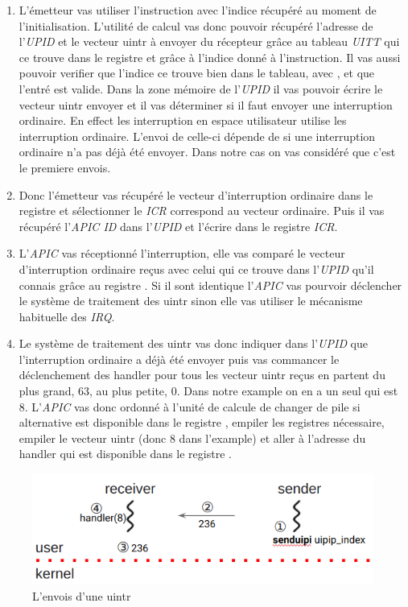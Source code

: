 \begin{enumerate}[label=\protect\circled{\arabic*}]
  \item L'émetteur vas utiliser l'instruction  avec l'indice récupéré au moment de l'initialisation.
  L'utilité de calcul vas donc pouvoir récupéré l'adresse de l'\emph{UPID} et le vecteur uintr à envoyer du récepteur grâce au tableau \emph{UITT} qui ce trouve dans le registre  et grâce à l'indice donné à l'instruction.
  Il vas aussi pouvoir verifier que l'indice ce trouve bien dans le tableau, avec , et que l'entré est valide.
  Dans la zone mémoire de l'\emph{UPID} il vas pouvoir écrire le vecteur uintr envoyer et il vas déterminer si il faut envoyer une interruption ordinaire.
  En effect les interruption en espace utilisateur utilise les interruption ordinaire.
  L'envoi de celle-ci dépende de si une interruption ordinaire n'a pas déjà été envoyer.
  Dans notre cas on vas considéré que c'est le premiere envois.
  \item Donc l'émetteur vas récupéré le vecteur d'interruption ordinaire dans le registre  et sélectionner le \emph{ICR} correspond au vecteur ordinaire.
  Puis il vas récupéré l'\emph{APIC ID} dans l'\emph{UPID} et l'écrire dans le registre \emph{ICR}.
  \item L'\emph{APIC} vas réceptionné l'interruption, elle vas comparé le vecteur d'interruption ordinaire reçus avec celui qui ce trouve dans l'\emph{UPID} qu'il connais grâce au registre .
  Si il sont identique l'\emph{APIC} vas pourvoir déclencher le système de traitement des uintr sinon elle vas utiliser le mécanisme habituelle des \emph{IRQ}.
  \item Le système de traitement des uintr vas donc indiquer dans l'\emph{UPID} que l'interruption ordinaire a déjà été envoyer puis vas commancer le déclenchement des handler pour tous les vecteur uintr reçus en partent du plus grand, 63, au plus petite, 0. %
  Dans notre example on en a un seul qui est 8.
  L'\emph{APIC} vas donc ordonné à l'unité de calcule de changer de pile si alternative est disponible dans
  le registre , empiler les registres nécessaire, empiler le vecteur uintr (donc 8 dans l'example) et aller à l'adresse du handler qui est disponible dans le registre .
\end{enumerate}

\begin{figure}[H]
  \includegraphics[width=\textwidth]{images/uintrSend.png}
  \caption{L'envois d'une uintr}
  \label{fig:sendUintr}
\end{figure}

